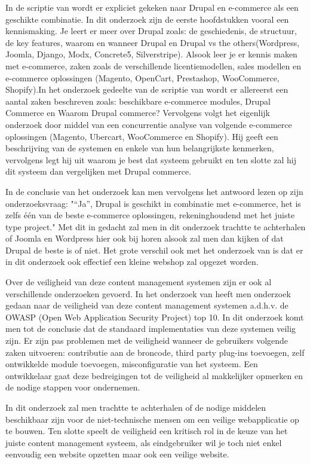 In de scriptie van \textcite{Crombrugge2015} wordt er expliciet gekeken naar Drupal en e-commerce als een geschikte combinatie. In dit onderzoek zijn de eerste hoofdstukken vooral een kennismaking. Je leert er meer over Drupal zoals: de geschiedenis, de structuur, de key features, waarom en wanneer Drupal en Drupal vs the others(Wordpress, Joomla, Django, Modx, Concrete5, Silverstripe).  Alsook leer je er kennis maken met e-commerce, zaken zoals de verschillende licentiemodellen, sales modellen en e-commerce oplossingen (Magento, OpenCart, Prestashop, WooCommerce, Shopify).In het onderzoek gedeelte van de scriptie van \textcite{Crombrugge2015} wordt er allereerst een aantal zaken beschreven zoals: beschikbare e-commerce modules, Drupal Commerce en Waarom Drupal commerce? Vervolgens volgt het eigenlijk onderzoek door middel van een concurrentie analyse van volgende e-commerce oplossingen (Magento, Ubercart, WooCommerce en Shopify). Hij geeft een beschrijving van de systemen en enkele van hun belangrijkste kenmerken, vervolgens legt hij uit waarom je best dat systeem gebruikt en ten slotte zal hij dit systeem dan vergelijken met Drupal commerce. 

In de conclusie van het onderzoek kan men vervolgens het antwoord lezen op zijn onderzoeksvraag: "“Ja”, Drupal is geschikt in combinatie met e-commerce, het is zelfs één van de beste e-commerce oplossingen, rekeninghoudend met het juiste type project."\parencite{Crombrugge2015} Met dit in gedacht zal men in dit onderzoek trachtte te achterhalen of Joomla en Wordpress hier ook bij horen alsook zal men dan kijken of dat Drupal de beste is of niet. Het grote verschil ook met het onderzoek van \textcite{Crombrugge2015} is dat er in dit onderzoek ook effectief een kleine webshop zal opgezet worden.

Over de veiligheid van deze content management systemen zijn er ook al verschillende onderzoeken gevoerd. In het onderzoek van \textcite{DeHaes2016} heeft men onderzoek gedaan naar de veiligheid van deze content management systemen a.d.h.v. de OWASP (Open Web Application Security Project) top 10. In dit onderzoek komt men tot de conclusie dat de standaard implementaties van deze systemen veilig zijn. Er zijn pas problemen met de veiligheid wanneer de gebruikers volgende zaken uitvoeren: contributie aan de broncode, third party plug-ins toevoegen, zelf ontwikkelde module toevoegen, misconfiguratie van het systeem. Een ontwikkelaar gaat deze bedreigingen tot de veiligheid al makkelijker opmerken en de nodige stappen voor ondernemen.

In dit onderzoek zal men trachtte te achterhalen of de nodige middelen beschikbaar zijn voor de niet-technische mensen om een veilige webapplicatie op te bouwen. Ten slotte speelt de veiligheid een kritisch rol in de keuze van het juiste content management systeem, als eindgebruiker wil je toch niet enkel eenvoudig een website opzetten maar ook een veilige website.